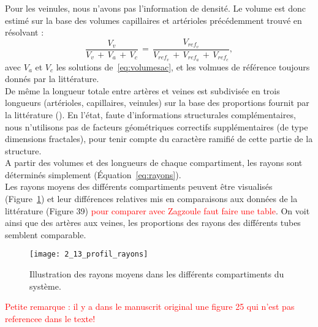 Pour les veinules, nous n’avons pas l’information de densité. Le volume est donc estimé sur la base des volumes capillaires et artérioles précédemment trouvé en résolvant : 
\begin{equation}
\frac{V_{v}}{V_v\,+\,V_a\,+\,V_c}\,=\,\frac{V_{ref_{v}}}{V_{ref_{v}}\,+\,V_{ref_{a}}\,+\,V_{ref_{c}}},
\end{equation}
avec $V_a$ et $V_c$ les solutions de~\ref{eq:volumesac}, et les volmues de référence toujours donnés par la littérature.\\
De même la longueur totale entre artères et veines est subdivisée en trois longueurs (artérioles, capillaires, veinules) sur la base des proportions fournit par la littérature (\cite{Zagzoule1986}). En l’état, faute d’informations structurales complémentaires, nous n’utilisons pas de facteurs géométriques correctifs supplémentaires (de type dimensions fractales), pour tenir compte du caractère ramifié de cette partie de la structure. \\
A partir des volumes et des longueurs de chaque compartiment, les rayons sont déterminés simplement (Équation~\ref{eq:rayons}). \\
Les rayons moyens des différents compartiments peuvent être visualisés (Figure~\ref{fig:2_13_profil_rayons}) et leur différences relatives mis en comparaisons aux données de la littérature (Figure 39) \textcolor{red}{pour comparer avec Zagzoule faut faire une table}. On voit ainsi que des artères aux veines, les proportions des rayons des différents tubes semblent comparable.\\
\begin{figure}[!t]
\centering
\texttt{[image: 2\_13\_profil\_rayons]}
\caption{Illustration des rayons moyens dans les différents compartiments du système.}
\label{fig:2_13_profil_rayons}	
\end{figure}	
\textcolor{red}{Petite remarque : il y a dans le manuscrit original une figure 25 qui n'est pas referencee dans le texte!}
